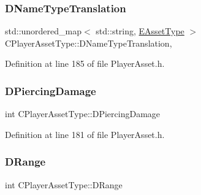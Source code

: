 \hypertarget{classCPlayerAssetType_a4e7728e5316eb5c1124dcac90f5290d5}{}\label{classCPlayerAssetType_a4e7728e5316eb5c1124dcac90f5290d5} 
\subsubsection{\texorpdfstring{D\+Name\+Type\+Translation}{DNameTypeTranslation}}
{\footnotesize\ttfamily std\+::unordered\+\_\+map$<$ std\+::string, \hyperlink{GameDataTypes_8h_a5600d4fc433b83300308921974477fec}{E\+Asset\+Type} $>$ C\+Player\+Asset\+Type\+::\+D\+Name\+Type\+Translation\hspace{0.3cm}{\ttfamily [static]}, {\ttfamily [protected]}}



Definition at line 185 of file Player\+Asset.\+h.

\hypertarget{classCPlayerAssetType_af7303175365306fb69e5ff9170b72234}{}\label{classCPlayerAssetType_af7303175365306fb69e5ff9170b72234} 
\subsubsection{\texorpdfstring{D\+Piercing\+Damage}{DPiercingDamage}}
{\footnotesize\ttfamily int C\+Player\+Asset\+Type\+::\+D\+Piercing\+Damage\hspace{0.3cm}{\ttfamily [protected]}}



Definition at line 181 of file Player\+Asset.\+h.

\hypertarget{classCPlayerAssetType_a1204a9470d8940fdb81a63670a0f6779}{}\label{classCPlayerAssetType_a1204a9470d8940fdb81a63670a0f6779} 
\subsubsection{\texorpdfstring{D\+Range}{DRange}}
{\footnotesize\ttfamily int C\+Player\+Asset\+Type\+::\+D\+Range\hspace{0.3cm}{\ttfamily [protected]}}



